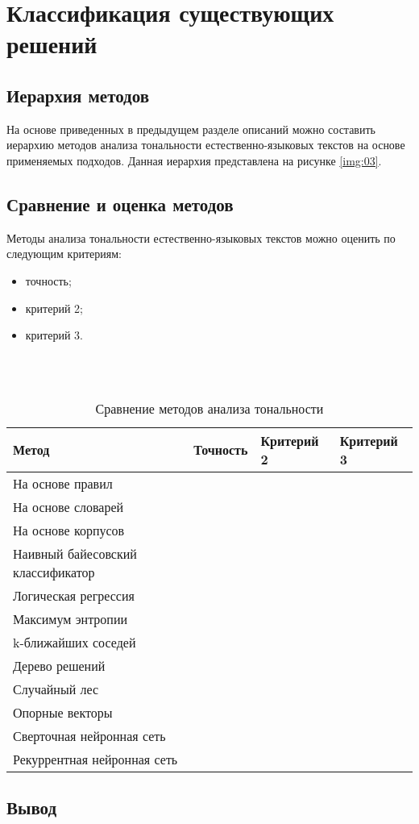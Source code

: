 \chapter{Классификация существующих решений}

\section{Иерархия методов}

На основе приведенных в предыдущем разделе описаний можно составить иерархию
методов анализа тональности естественно-языковых текстов на основе применяемых
подходов. Данная иерархия представлена на рисунке \ref{img:03}.


\section{Сравнение и оценка методов}

Методы анализа тональности естественно-языковых текстов можно оценить по
следующим критериям:
\begin{itemize}
    \item точность;
    \item критерий 2;
    \item критерий 3.
\end{itemize}
~\\
~\\

\noindent
\captionsetup{format=hang,justification=raggedright,
              singlelinecheck=off,width=13.5cm}
\begin{longtable}[c]{|p{5cm}|p{2cm}|p{3cm}|p{3cm}|}
\caption{Сравнение методов анализа тональности\label{tbl:time_mes}}\\ \hline
    \textbf{Метод} & \textbf{Точность}
                   & \textbf{Критерий 2} & \textbf{Критерий 3}\\ \hline
    На основе правил    &    &    & \\ \hline
    На основе словарей  &    &    & \\ \hline
    На основе корпусов  &    &    & \\ \hline
    Наивный
    байесовский
    классификатор       &    &    & \\ \hline
    Логическая
    регрессия           &    &    & \\ \hline
    Максимум энтропии   &    &    & \\ \hline
    k-ближайших соседей &    &    & \\ \hline
    Дерево решений      &    &    & \\ \hline
    Случайный лес       &    &    & \\ \hline
    Опорные векторы     &    &    & \\ \hline
    Сверточная
    нейронная сеть      &    &    & \\ \hline
    Рекуррентная
    нейронная сеть      &    &    & \\ \hline
\end{longtable}

\section{Вывод}
